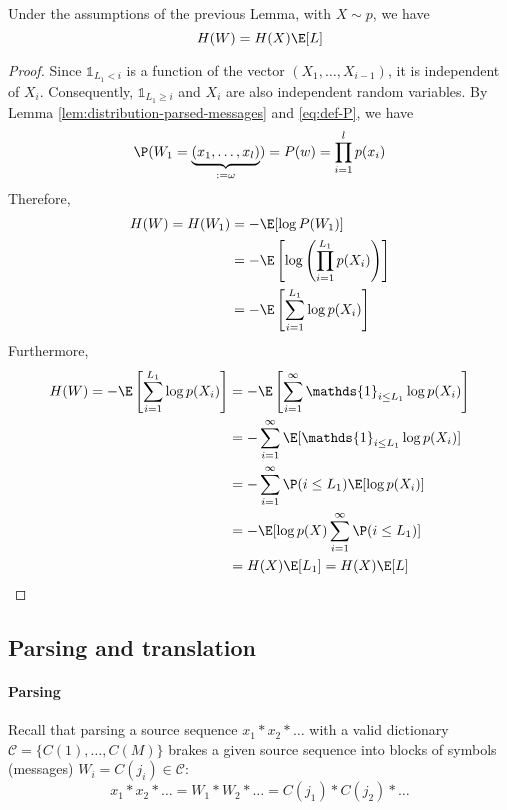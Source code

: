 \documentclass[toc]{../cs-classes/cs-classes}
\begin{document}
\begin{property}
    Under the assumptions of the previous Lemma, with $X\sim p$, we have
    \begin{equation}
        \label{eq:parsed-message-entropy}
        H(W) = H(X) \E[L]
    \end{equation}
\end{property}
\begin{proof}
    Since $\mathds{1}_{L_1<i}$ is a function of the vector $(X_1, \dots, X_{i-1})$, it is independent of $X_i$. Consequently, $\mathds{1}_{L_1\geq i}$ and $X_i$ are also independent random variables. By Lemma \ref{lem:distribution-parsed-messages} and \eqref{eq:def-P}, we have
    \begin{equation*}
        \P(W_1 = \underbrace{(x_1, \dots, x_l)}_{:=\omega}) = P(w) = \prod_{i=1}^l p(x_i)
    \end{equation*}
    Therefore,
    \begin{equation*}
        \begin{aligned}
            H(W) = H(W_1) &= - \E[\log P(W_1)]\\
            &= -\E\left[\log\left(\prod_{i=1}^{L_1}p(X_i)\right)\right]\\
            &= -\E\left[\sum_{i=1}^{L_1}\log p(X_i)\right]
        \end{aligned}
    \end{equation*}
    Furthermore,
    \begin{equation*}
        \begin{aligned}
            H(W) = -\E\left[\sum_{i=1}^{L_1}\log p(X_i)\right] &= -\E\left[\sum_{i=1}^\infty \mathds{1}_{i\leq L_1}\log p(X_i)\right]\\
            &= - \sum_{i=1}^\infty \E[\mathds{1}_{i\leq L_1} \log p(X_i)]\\
            &= - \sum_{i=1}^\infty \P(i\leq L_1) \E[\log p(X_i)]\\
            &= -\E[\log p(X) \sum_{i=1}^\infty \P(i\leq L_1)]\\
            &= H(X) \E[L_1] = H(X)\E[L]
        \end{aligned}
    \end{equation*}
\end{proof}

\subsection{Parsing and translation}
\paragraph*{Parsing} Recall that parsing a source sequence $x_1*x_2 * \dots$ with a valid dictionary $\mathcal{C} = \{C(1), \dots, C(M)\}$ brakes a given source sequence into blocks of symbols (messages) $W_i = C(j_i)\in\mathcal{C}$:
\begin{equation*}
    x_1*x_2*\dots = W_1 * W_2 * \dots = C(j_1) * C(j_2) * \dots
\end{equation*}
\end{document}
